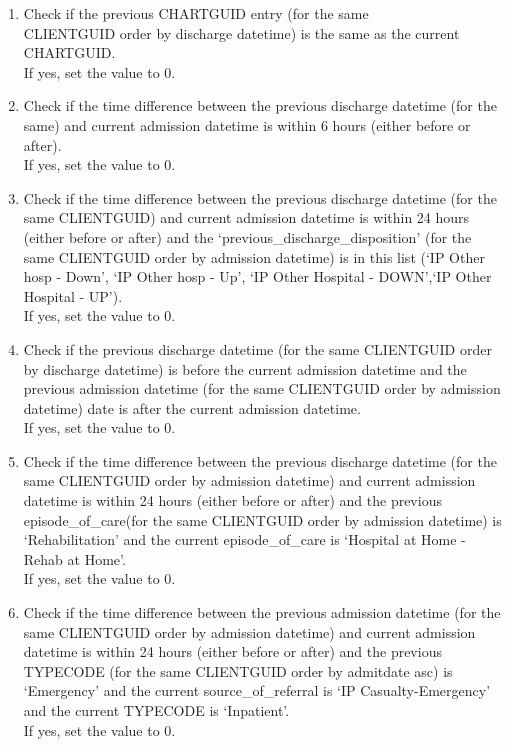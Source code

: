 \documentclass[
  a4paper,
  ,captions=tableheading
]{scrartcl}
\providecommand{\tightlist}{%
  \setlength{\itemsep}{0pt}\setlength{\parskip}{0pt}}
\begin{document}
\begin{enumerate}
\def\labelenumi{\arabic{enumi}.}
\tightlist
\item
  Check if the previous CHARTGUID entry (for the same\\
  CLIENTGUID order by discharge datetime) is the same as the current
  CHARTGUID.\\
  If yes, set the value to 0.
\item
  Check if the time difference between the previous discharge datetime
  (for the same) and current admission datetime is within 6 hours
  (either before or after).\\
  If yes, set the value to 0.
\item
  Check if the time difference between the previous discharge datetime
  (for the same CLIENTGUID) and current admission datetime is within 24
  hours (either before or after) and the
  `previous\_discharge\_disposition' (for the same CLIENTGUID order by
  admission datetime) is in this list (`IP Other hosp - Down', `IP Other
  hosp - Up', `IP Other Hospital - DOWN',`IP Other Hospital - UP').\\
  If yes, set the value to 0.
\item
  Check if the previous discharge datetime (for the same CLIENTGUID
  order by discharge datetime) is before the current admission datetime
  and the previous admission datetime (for the same CLIENTGUID order by
  admission datetime) date is after the current admission datetime.\\
  If yes, set the value to 0.
\item
  Check if the time difference between the previous discharge datetime
  (for the same CLIENTGUID order by admission datetime) and current
  admission datetime is within 24 hours (either before or after) and the
  previous episode\_of\_care(for the same CLIENTGUID order by admission
  datetime) is `Rehabilitation' and the current episode\_of\_care is
  `Hospital at Home - Rehab at Home'.\\
  If yes, set the value to 0.
\item
  Check if the time difference between the previous admission datetime
  (for the same CLIENTGUID order by admission datetime) and current
  admission datetime is within 24 hours (either before or after) and the
  previous TYPECODE (for the same CLIENTGUID order by admitdate asc) is
  `Emergency' and the current source\_of\_referral is `IP
  Casualty-Emergency' and the current TYPECODE is `Inpatient'.\\
  If yes, set the value to 0.
\end{enumerate}
\end{document}
